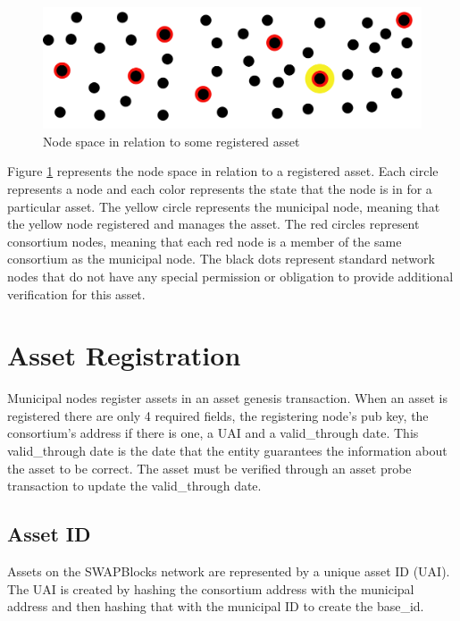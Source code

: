 \documentclass[12pt]{article}
\begin{document}
\begin{figure}[h]
	\centering
	\includegraphics[width=.85\textwidth]{node_space}
	\caption{Node space in relation to some registered asset}
	\label{fig:nodespace1}
\end{figure}


Figure \ref{fig:nodespace1} represents the node space in relation to a registered asset.
Each circle represents a node and each color represents the state that the
node is in for a particular asset.  The yellow circle represents the municipal node, meaning
that the yellow node registered and manages the asset.  The red circles represent consortium 
nodes, meaning that each red node is a member of the same consortium as the municipal node.
The black dots represent standard network nodes that do not have any special permission or
obligation to provide additional verification for this asset.  






\section{Asset Registration}

Municipal nodes register assets in an asset genesis transaction.  When 
an asset is registered there are only 4 required fields, the registering node's 
pub key, the consortium's address if there is one, a UAI and a valid\_through date.  
This valid\_through date is the date that the entity guarantees the information 
about the asset to be correct.  The asset must be verified through an asset probe 
transaction to update the valid\_through date.

\subsection{Asset ID}

Assets on the SWAPBlocks network are represented by a unique asset ID (UAI).  
The UAI is created by hashing the consortium address with the municipal address 
and then hashing that with the municipal ID to create the base\_id.
\end{document}
